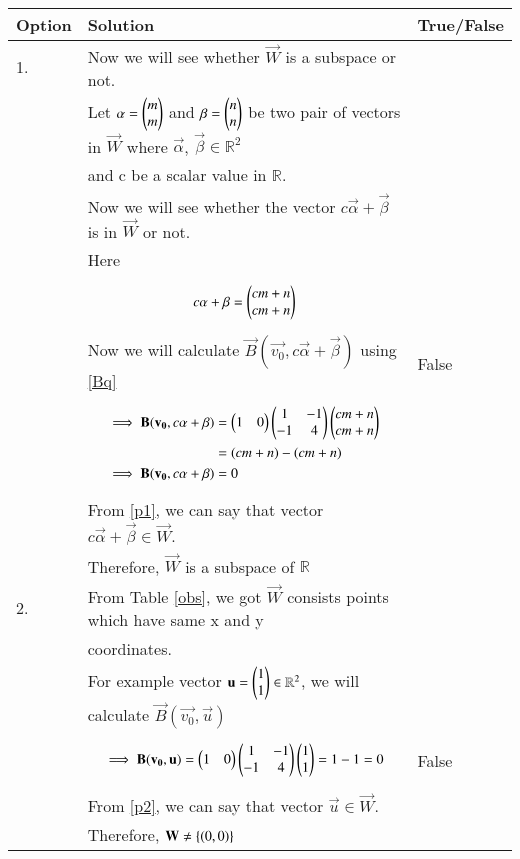 \documentclass[journal,12pt]{IEEEtran}
\begin{document}
\begin{longtable}{|l|l|l|}
\hline
\endhead
\textbf{Option}&\textbf{Solution}&\textbf{True/False}\\
\hline
1.&Now we will see whether $\vec{W}$ is a subspace or not.&\\&Let $\mathbf{\alpha}=\begin{pmatrix}m\\m\end{pmatrix}$ and $\mathbf{\beta}=\begin{pmatrix}n\\n\end{pmatrix}$ be two pair of vectors in $\vec{W}$ where $\vec{\alpha}$, $\vec{\beta}\in\mathbb{R}^2$&\\& and c be a scalar value in $\mathbb{R}$.&\\&Now we will see whether the vector $c\vec{\alpha}+\vec{\beta}$ is in $\vec{W}$ or not.&\\
&Here&\\&\parbox{13cm}{\begin{align}
    c\mathbf{\alpha}+\mathbf{\beta}=\begin{pmatrix}cm+n\\cm+n\end{pmatrix}
\end{align}}&\\&Now we will calculate $\vec{B}(\vec{v_0},c\vec{\alpha}+\vec{\beta})$ using \eqref{Bq}&False\\&\parbox{13cm}{\begin{align}
    \implies\mathbf{B}(\mathbf{v_0},c\mathbf{\alpha}+\mathbf{\beta})&=\begin{pmatrix}1&0\end{pmatrix}\begin{pmatrix}1&-1\\-1&4\end{pmatrix}\begin{pmatrix}cm+n\\cm+n\end{pmatrix}\\
    &=(cm+n)-(cm+n)\\
    \implies\mathbf{B}(\mathbf{v_0},c\mathbf{\alpha}+\mathbf{\beta})&=0\label{p1}
\end{align}}&\\&From \eqref{p1}, we can say that vector $c\vec{\alpha}+\vec{\beta}\in\vec{W}$.&\\&Therefore, $\vec{W}$ is a subspace of $\mathbb{R}$&\\
.&From Table \ref{obs}, we got $\vec{W}$ consists points which have same x and y &\\&coordinates.&\\&For example vector $\mathbf{u}=\begin{pmatrix}1\\1\end{pmatrix}\in\mathbb{R}^2$, we will calculate $\vec{B}(\vec{v_0},\vec{u})$&\\&\parbox{13cm}{\begin{align}
    \implies\mathbf{B}(\mathbf{v_0},\mathbf{u})=\begin{pmatrix}1&0\end{pmatrix}\begin{pmatrix}1&-1\\-1&4\end{pmatrix}\begin{pmatrix}1\\1\end{pmatrix}=1-1=0\label{p2}
\end{align}}&False\\&From \eqref{p2}, we can say that vector $\vec{u}\in\vec{W}$.&\\&Therefore, $\mathbf{W}\neq\left\{(0,0)\right\}$&\\

\end{longtable}
\end{document}
